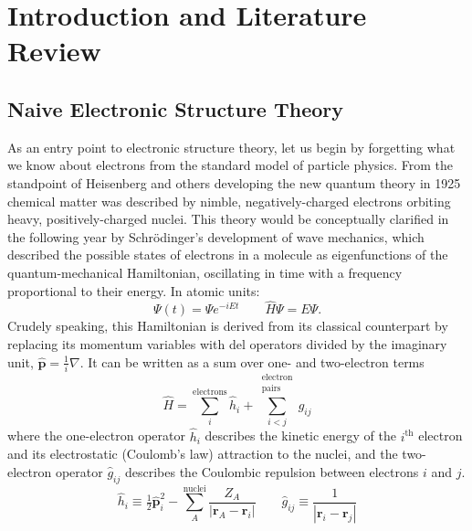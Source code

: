 \chapter[%
    Introduction and Literature Review
]{%
    Introduction and Literature Review
}

\section{Naive Electronic Structure Theory}

As an entry point to electronic structure theory, let us begin by forgetting
what we know about electrons from the standard model of particle physics.
From the standpoint of Heisenberg and others developing the new quantum theory
in 1925\cite{Heisenberg:1925p879} chemical matter was described by nimble,
negatively-charged electrons orbiting heavy, positively-charged nuclei.
This theory would be conceptually clarified in the following year by
Schr\"odinger's development of wave mechanics,
\cite{Schrodinger:1926p361,Schrodinger:1926p489,Schrodinger:1926p734} which
described the possible states of electrons in a molecule as eigenfunctions of
the quantum-mechanical Hamiltonian, oscillating in time with a frequency
proportional to their energy.
In atomic units:
\begin{equation}
    \Psi(t)
    =
    \Psi
    e^{-iEt}
    \qquad
    \hat{H}
    \Psi
    =
    E
    \Psi.
\end{equation}
Crudely speaking, this Hamiltonian is derived from its classical counterpart by
replacing its momentum variables with del operators divided by the imaginary
unit,
\(
    \hat{\mathbf{p}}
    =
    \frac{1}{i}
    \nabla
\).
It can be written as a sum over one- and two-electron terms
\begin{equation}
    \hat{H}
    =
    \sum_i^\text{electrons}
    \hat{h}_i
    +
    \sum_{i<j}^{\substack{\text{electron}\\\text{pairs}}}
    \hat{g}_{ij}
\end{equation}
where the one-electron operator
\(
    \hat{h}_i
\)
describes the kinetic energy of the \(i^\text{th}\) electron and its
electrostatic (Coulomb's law) attraction to the nuclei, and the two-electron
operator
\(
    \hat{g}_{ij}
\)
describes the Coulombic repulsion between electrons \(i\) and \(j\).
\begin{equation}
    \hat{h}_i
    \equiv
    \tfrac{1}{2}
    \hat{\mathbf{p}}_i^2
    -
    \sum_A^\text{nuclei}
    \frac{Z_A}{|\mathbf{r}_A - \mathbf{r}_i|}
    \qquad
    \hat{g}_{ij}
    \equiv
    \frac{1}{|\mathbf{r}_i - \mathbf{r}_j|}
\end{equation}
